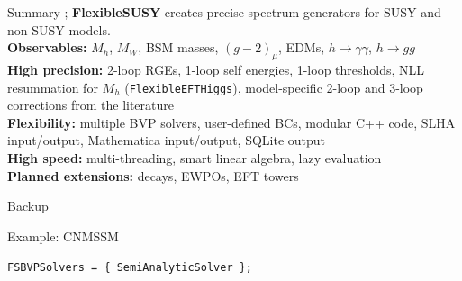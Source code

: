 \documentclass[hyperref={pdfpagelabels=false},ngerman]{beamer}
\renewcommand{\emph}{\textbf}
\begin{document}
\begin{frame}{Summary}
  ;%
  \emph{FlexibleSUSY} creates precise spectrum generators for SUSY and
  non-SUSY models.\\[1em]
  \emph{Observables:} $M_h$, $M_W$, BSM masses, $(g-2)_\mu$, EDMs,
  $h\rightarrow\gamma\gamma$, $h\rightarrow gg$
  \\[0.5em]
  \emph{High precision:} 2-loop RGEs, 1-loop self energies, 1-loop
  thresholds, NLL resummation for $M_h$ (\texttt{FlexibleEFTHiggs}),
  model-specific 2-loop and 3-loop corrections from the literature
  \\[0.5em]
  \emph{Flexibility:} multiple BVP solvers, user-defined BCs, modular
  C++ code, SLHA input/output, Mathematica input/output, SQLite output
  \\[0.5em]
  \emph{High speed:} multi-threading, smart linear algebra, lazy evaluation
  \\[1em]
  \emph{Planned extensions:} decays, EWPOs, EFT towers
\end{frame}

\begin{frame}[noframenumbering]
  \begin{center}
    \Huge Backup
  \end{center}
\end{frame}

\begin{frame}[noframenumbering]{Example: CNMSSM}
  \begin{center}
  \end{center}
  \texttt{FSBVPSolvers = \{ SemiAnalyticSolver \};}
\end{frame}
\end{document}

